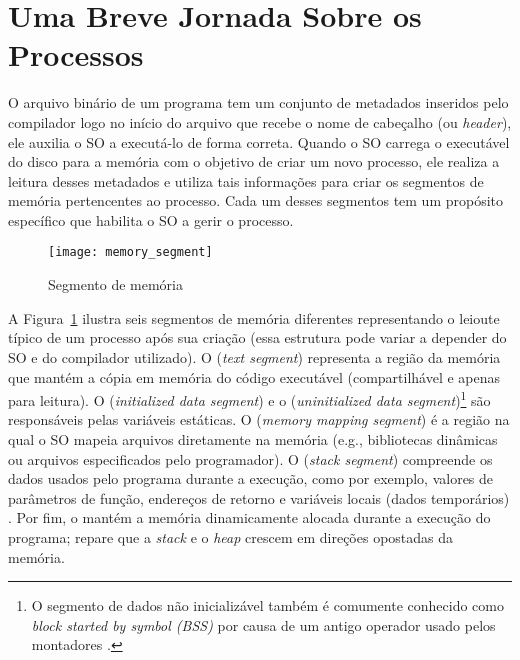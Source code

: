 \section{Uma Breve Jornada Sobre os Processos}
\label{sec:processos-e-threads}


O arquivo binário de um programa tem um conjunto de metadados inseridos pelo
compilador logo no início do arquivo que recebe o nome de cabeçalho (ou \textit{header}), ele
auxilia o SO a executá-lo de forma correta.  Quando o SO carrega o
executável do disco para a memória com o objetivo de criar um novo processo,
ele realiza a leitura desses metadados e utiliza tais informações para criar os
segmentos de memória pertencentes ao processo. Cada um desses segmentos tem um
propósito específico que habilita o SO a gerir o processo.

\begin{figure}[!h]
  \centering
  \texttt{[image: memory\_segment]} 
  \caption{Segmento de memória}
  \label{fig:memory_segment} 
\end{figure}

A Figura~\ref{fig:memory_segment} ilustra seis segmentos de memória diferentes
representando o leioute típico de um processo após sua criação (essa estrutura
pode variar a depender do SO e do compilador utilizado). O  (\emph{text segment}) representa a região da
memória que mantém a cópia em memória do código executável (compartilhável e
apenas para leitura). O 
(\emph{initialized data segment}) e o  (\emph{uninitialized data segment})\footnote{O segmento de dados
não inicializável também é comumente conhecido como \emph{block started by
symbol (BSS)} por causa de um antigo operador usado pelos montadores
\citep{gdb}.} são responsáveis pelas variáveis estáticas. O
 (\emph{memory mapping
segment}) é a região na qual o SO mapeia arquivos diretamente na memória (e.g.,
bibliotecas dinâmicas ou arquivos especificados pelo programador). O
 (\emph{stack segment}) compreende os dados
usados pelo programa durante a execução, como por exemplo, valores de
parâmetros de função, endereços de retorno e variáveis locais (dados
temporários) \citep{silberschatz}. Por fim, o 
mantém a memória dinamicamente alocada durante a execução do programa; repare
que a \emph{stack} e o \emph{heap} crescem em direções opostadas da memória.

